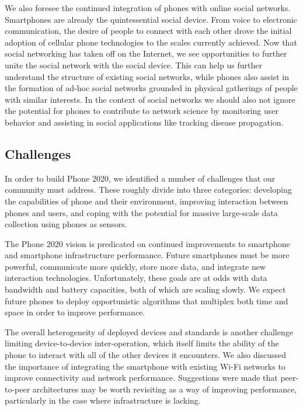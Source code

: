 We also foresee the continued integration of phones with online social
networks. Smartphones are already the quintessential social device. From
voice to electronic communication, the desire of people to connect with each
other drove the initial adoption of cellular phone technologies to the scales
currently achieved. Now that social networking has taken off on the Internet,
we see opportunities to further unite the social network with the social
device. This can help us further understand the structure of existing social
networks, while phones also assist in the formation of ad-hoc social networks
grounded in physical gatherings of people with similar interests. In the
context of social networks we should also not ignore the potential for phones
to contribute to network science by monitoring user behavior and assisting in
social applications like tracking disease propagation.

\subsection{Challenges}

In order to build Phone 2020, we identified a number of challenges that our
community must address. These roughly divide into three categories:
developing the capabilities of phone and their environment, improving
interaction between phones and users, and coping with the potential for
massive large-scale data collection using phones as sensors.
 
The Phone 2020 vision is predicated on continued improvements to smartphone
and smartphone infrastructure performance. Future smartphones must be more
powerful, communicate more quickly, store more data, and integrate new
interaction technologies. Unfortunately, these goals are at odds with data
bandwidth and battery capacities, both of which are scaling slowly. We expect
future phones to deploy opportunistic algorithms that multiplex both time and
space in order to improve performance.
 
The overall heterogeneity of deployed devices and standards is another
challenge limiting device-to-device inter-operation, which itself limits
the ability of the phone to interact with all of the other devices it
encounters. We also discussed the importance of integrating the smartphone
with existing Wi-Fi networks to improve connectivity and network performance.
Suggestions were made that peer-to-peer architectures may be worth revisiting
as a way of improving performance, particularly in the case where
infrastructure is lacking.
 
